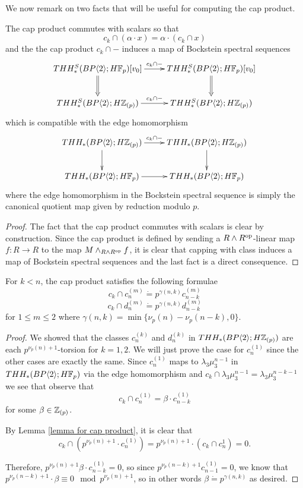 We now remark on two facts that will be useful for computing the cap product. 
\begin{lem}\label{lemma for cap product}
The cap product commutes with scalars so that 
\[ c_k \cap (\alpha \cdot x) = \alpha\cdot (c_k \cap x)\]
and the the cap product $c_k\cap -$ induces a map of Bockstein spectral sequences 
\[ 
	\xymatrix{ 
		THH_*^S(\B;H\F_p)[v_0] \ar[r]^{c_k\cap - } \ar@{=>}[d] & THH_*^S(\B;H\F_p)[v_0] \ar@{=>}[d] \\
		THH_*^S(\B;H\Z_{(p)}) \ar[r]^{c_k\cap -} & THH_*^S(\B;H\Z_{(p)})
		}
\]
which is compatible with the edge homomorphism 
\[ 
	\xymatrix{
		THH_*(\B;H\Z_{(p)}) \ar[d] \ar[r]^{c_k \cap -} &  THH_*(\B;H\Z_{(p)}) \ar[d]  \\
		THH_*(\B;H\F_p) \ar[r] & THH_*(\B;H\F_p) 
		}
\]
where the edge homomorphism in the Bockstein spectral sequence is simply the canonical quotient map given by reduction modulo $p$. 
\end{lem}
\begin{proof}
The fact that the cap product commutes with scalars is clear by construction. Since the cap product is defined by sending a $R\wedge R^{\mathrm{op}}$-linear map $f \colon R\to R$ to the map $M\wedge _{R\wedge R^{\mathrm{op}}} f$, it is clear that capping with class induces a map of Bockstein spectral sequences and the last fact is a direct consequence. 
\end{proof}
	
\begin{cor}
For $k < n$, the cap product satisfies the following formulae
\[c_{k}\cap c_n^{(m)} \dot{=} p^{\gamma(n,k)}
c_{n-k}^{(m)}\]
\[c_{k}\cap d_n^{(m)} \dot{=} p^{\gamma(n,k)} d_{n-k}^{(m)}\]
for $1\le m \le 2$ where $\gamma(n,k)=\min\{ \nu_p(n)-\nu_p(n-k),0\}$. 
\end{cor}

\begin{proof}
We showed that the classes $c_n^{(k)}$ and $d_n^{(k)}$ in $THH_*(BP\langle 2 \rangle;H\mathbb{Z}_{(p)})$ are each $p^{\nu_p(n)+1}$-torsion for $k=1,2$. We will just prove the case for $c_n^{(1)}$ since the other cases are exactly the same. Since $c_n^{(1)}$ maps to $\lambda_3\mu_3^{n-1}$ in $THH_*(BP\langle 2 \rangle;H\mathbb{F}_p)$ via the edge homomorphism and $c_k\cap \lambda_3\mu_3^{n-1}=\lambda_3\mu_3^{n-k-1}$ we see that observe that 
\[ c_{k}\cap c_n^{(1)}=\beta \cdot c_{n-k}^{(1)}\]
 for some $\beta \in \mathbb{Z}_{(p)}$. 

By Lemma \ref{lemma for cap product}, it is clear that 
\[ c_{k}\cap ( p^{\nu_p(n)+1} \cdot c_n^{(1)})=p^{\nu_p(n)+1}\cdot (c_k \cap c_n^{1})=0.\]

Therefore, $p^{\nu_p(n)+1}\beta \cdot c_{n-k}^{(1)}=0$, 
so since $p^{\nu_p(n-k)+1}c_{n-1}^{(1)}=0$, we know that $p^{\nu_p(n-k)+1}\cdot \beta \equiv 0 \mod p^{\nu_p(n)+1}$, so in other words $\beta \dot{=} p^{\gamma(n,k)}$ as desired. 
\end{proof}

